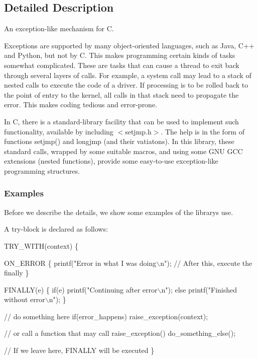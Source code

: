 \subsection{Detailed Description}
An exception-\/like mechanism for C. 

Exceptions are supported by many object-\/oriented languages, such as Java, C++ and Python, but not by C. This makes programming certain kinds of tasks somewhat complicated. These are tasks that can cause a thread to exit back through several layers of calls. For example, a system call may lead to a stack of nested calls to execute the code of a driver. If processing is to be rolled back to the point of entry to the kernel, all calls in that stack need to propagate the error. This makes coding tedious and error-\/prone.

In C, there is a standard-\/library facility that can be used to implement such functionality, available by including {\ttfamily $<$setjmp.\+h$>$}. The help is in the form of functions {\ttfamily setjmp()} and {\ttfamily longjmp} (and their vatiatons). In this library, these standard calls, wrapped by some suitable macros, and using some G\+NU G\+CC extensions (nested functions), provide some easy-\/to-\/use exception-\/like programming structures.

\subsubsection*{Examples}

Before we describe the details, we show some examples of the library\textquotesingle{}s use.

A try-\/block is declared as follows\+: 
\begin{DoxyCode}
TRY\_WITH(context) \{

    ON\_ERROR \{
        printf(\textcolor{stringliteral}{"Error in what I was doing\(\backslash\)n"});
        \textcolor{comment}{// After this, execute the finally }
    \}

    FINALLY(e) \{
        \textcolor{keywordflow}{if}(e) 
            printf(\textcolor{stringliteral}{"Continuing after error\(\backslash\)n"});         
        \textcolor{keywordflow}{else}
            printf(\textcolor{stringliteral}{"Finished without error\(\backslash\)n"});
    \}

    \textcolor{comment}{// do something here }
    \textcolor{keywordflow}{if}(error\_happens)
        raise\_exception(context);

    \textcolor{comment}{// or call a function that may call raise\_exception()}
    do\_something\_else();

    \textcolor{comment}{// If we leave here, FINALLY will be executed }
\}
\end{DoxyCode}



